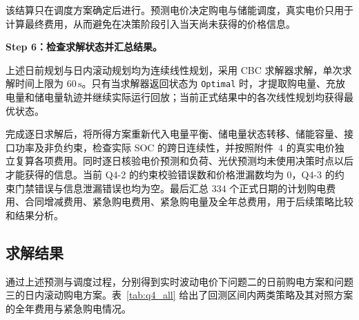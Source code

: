 该结算只在调度方案确定后进行。预测电价决定购电与储能调度，真实电价只用于计算最终费用，从而避免在决策阶段引入当天尚未获得的价格信息。

\textbf{Step 6：检查求解状态并汇总结果。}

上述日前规划与日内滚动规划均为连续线性规划，采用 CBC 求解器求解，单次求解时间上限为 $60\,\mathrm{s}$。只有当求解器返回状态为 \texttt{Optimal} 时，才提取购电量、充放电量和储电量轨迹并继续实际运行回放；当前正式结果中的各次线性规划均获得最优状态。

完成逐日求解后，将所得方案重新代入电量平衡、储电量状态转移、储能容量、接口功率及非负约束，检查实际 SOC 的跨日连续性，并按照附件~4 的真实电价独立复算各项费用。同时逐日核验电价预测和负荷、光伏预测均未使用决策时点以后才能获得的信息。当前 Q4-2 的约束校验错误数和价格泄漏数均为 $0$，Q4-3 的约束门禁错误与信息泄漏错误也均为空。最后汇总 $334$ 个正式日期的计划购电费用、合同增减费用、紧急购电费用、紧急购电量及全年总费用，用于后续策略比较和结果分析。

\subsection{求解结果}

通过上述预测与调度过程，分别得到实时波动电价下问题二的日前购电方案和问题三的日内滚动购电方案。表~\ref{tab:q4_all} 给出了回测区间内两类策略及其对照方案的全年费用与紧急购电情况。

